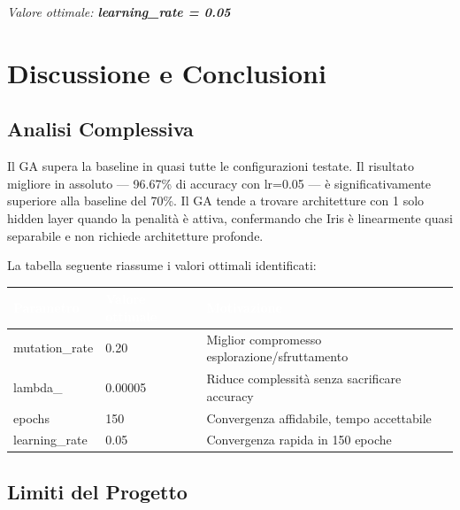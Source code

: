 \documentclass[12pt, a4paper]{article}
\begin{document}
\textit{Valore ottimale: \textbf{learning\_rate = 0.05}}

\newpage

\section{Discussione e Conclusioni}

\subsection{Analisi Complessiva}

Il GA supera la baseline in quasi tutte le configurazioni testate. Il risultato
migliore in assoluto --- 96.67\% di accuracy con lr=0.05 --- è
significativamente superiore alla baseline del 70\%. Il GA tende a trovare
architetture con 1 solo hidden layer quando la penalità è attiva, confermando
che Iris è linearmente quasi separabile e non richiede architetture profonde.

La tabella seguente riassume i valori ottimali identificati:

\begin{center}
\begin{tabular}{lll}
    \toprule
    \rowcolor{headerblue}
    \textcolor{white}{\textbf{Parametro}} &
    \textcolor{white}{\textbf{Valore ottimale}} &
    \textcolor{white}{\textbf{Motivazione}} \\
    \midrule
    mutation\_rate & 0.20    & Miglior compromesso esplorazione/sfruttamento \\
    \rowcolor{rowgray}
    lambda\_       & 0.00005 & Riduce complessità senza sacrificare accuracy  \\
    epochs         & 150     & Convergenza affidabile, tempo accettabile      \\
    \rowcolor{rowgray}
    learning\_rate & 0.05    & Convergenza rapida in 150 epoche               \\
    \bottomrule
\end{tabular}
\end{center}

\subsection{Limiti del Progetto}
\end{document}
